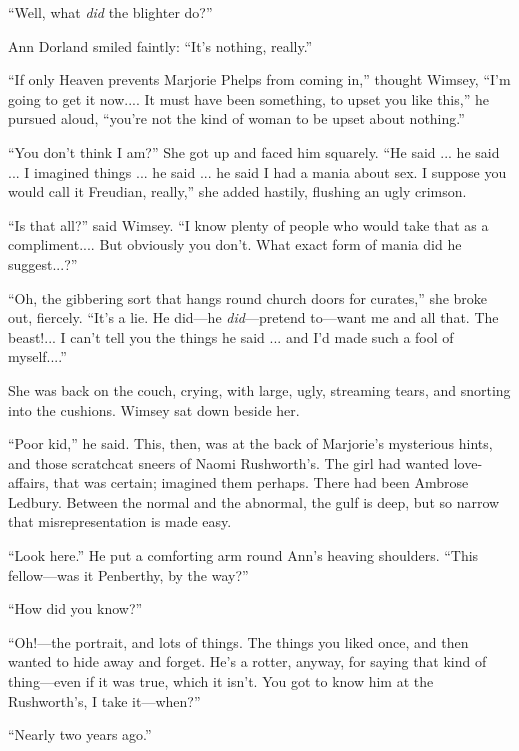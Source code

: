 \enquote{Well, what \textit{did} the blighter do?}

Ann Dorland smiled faintly: \enquote{It's nothing, really.}

\enquote{If only Heaven prevents Marjorie Phelps from coming in,} thought Wimsey, \enquote{I'm going to get it now.... It must have been something, to upset you like this,} he pursued aloud, \enquote{you're not the kind of woman to be upset about nothing.}

\enquote{You don't think I am?} She got up and faced him squarely. \enquote{He said ... he said ... I imagined things ... he said ... he said I had a mania about sex. I suppose you would call it Freudian, really,} she added hastily, flushing an ugly crimson.

\enquote{Is that all?} said Wimsey. \enquote{I know plenty of people who would take that as a compliment.... But obviously you don't. What exact form of mania did he suggest...?}

\enquote{Oh, the gibbering sort that hangs round church doors for curates,} she broke out, fiercely. \enquote{It's a lie. He did\allowbreak---\allowbreak he \textit{did}---pretend to\allowbreak---\allowbreak want me and all that. The beast!... I can't tell you the things he said ... and I'd made such a fool of myself....}

She was back on the couch, crying, with large, ugly, streaming tears, and snorting into the cushions. Wimsey sat down beside her.

\enquote{Poor kid,} he said. This, then, was at the back of Marjorie's mysterious hints, and those scratchcat sneers of Naomi Rushworth's. The girl had wanted love-affairs, that was certain; imagined them perhaps. There had been Ambrose Ledbury. Between the normal and the abnormal, the gulf is deep, but so narrow that misrepresentation is made easy.

\enquote{Look here.} He put a comforting arm round Ann's heaving shoulders. \enquote{This fellow\allowbreak---\allowbreak was it Penberthy, by the way?}

\enquote{How did you know?}

\enquote{Oh!---the portrait, and lots of things. The things you liked once, and then wanted to hide away and forget. He's a rotter, anyway, for saying that kind of thing\allowbreak---\allowbreak even if it was true, which it isn't. You got to know him at the Rushworth's, I take it\allowbreak---\allowbreak when?}

\enquote{Nearly two years ago.}

